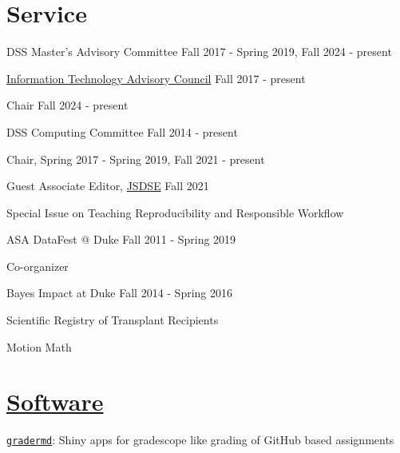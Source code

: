 \documentclass[margin,line]{res}
\begin{document}
\begin{resume}
\vspace{4mm}

\section{\sc Service}


DSS Master's Advisory Committee \hfill Fall 2017 - Spring 2019, Fall 2024 - present

\href{http://services.duke.edu/itac/}{Information Technology Advisory Council} \hfill Fall 2017 - present
\begin{list1}
\item[] Chair Fall 2024 - present
\end{list1}

DSS Computing Committee \hfill Fall 2014 - present
\begin{list1}
\item[] Chair, Spring 2017 - Spring 2019, Fall 2021 - present
\end{list1}

Guest Associate Editor, \href{https://www.tandfonline.com/action/journalInformation?show=aimsScope&journalCode=ujse20}{JSDSE} \hfill Fall 2021\\
\begin{list1}
\item[] Special Issue on Teaching Reproducibility and Responsible Workflow
\end{list1}

ASA DataFest @ Duke \hfill Fall 2011 - Spring 2019
\begin{list1}
\item[] Co-organizer
\end{list1}

\pagebreak

Bayes Impact at Duke \hfill Fall 2014 - Spring 2016
\begin{list1}
\item[] Scientific Registry of Transplant Recipients
\item[] Motion Math
\end{list1}


\section{\sc \href{https://github.com/rundel/}{Software}}

\href{https://github.com/rundel/gradermd}{\texttt{gradermd}}: Shiny apps for gradescope like grading of GitHub based assignments


\end{resume}
\end{document}
